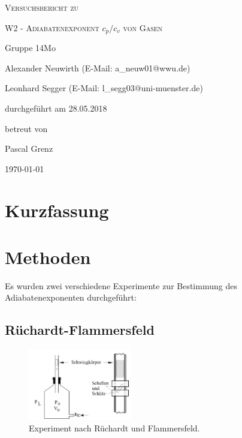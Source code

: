 \documentclass[
	a4paper,
	12pt,
	pagesize,
	ngerman
]{scrartcl}
\begin{document}
	
	\begin{titlepage}
		\centering
		{\scshape\LARGE Versuchsbericht zu \par}
		\vspace{1cm}
		{\scshape\huge W2 - Adiabatenexponent $c_p/c_v$ von Gasen \par} %
		\vspace{2.5cm}
		{\LARGE Gruppe 14Mo \par}
		\vspace{0.5cm}
		
		{\large Alexander Neuwirth (E-Mail: a\_neuw01@wwu.de) \par}
		{\large Leonhard Segger (E-Mail: l\_segg03@uni-muenster.de) \par}
		\vfill
		
		durchgeführt am 28.05.2018\par
		betreut von\par
		{\large Pascal Grenz}
		
		\vfill
		
		{\large \today\par}
	\end{titlepage}
	\tableofcontents
	\newpage


	\section{Kurzfassung}
	
	
	\section{Methoden} \label{sec_Methoden}
	Es wurden zwei verschiedene Experimente zur Bestimmung des Adiabatenexponenten durchgeführt:
	\subsection{Rüchardt-Flammersfeld}
	
	\begin{figure}[H]
		\includegraphics[width=0.4\textwidth]{flammer}
		\centering
		\caption{Experiment nach Rüchardt und Flammersfeld. \cite{abbildungen}}
		\label{aufbau_flammer}
		\centering
	\end{figure} 
\end{document}
